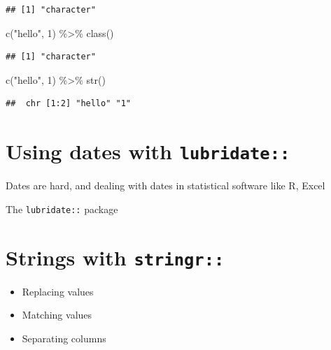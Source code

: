\documentclass[
]{book}
\newenvironment{Shaded}{\begin{snugshade}}{\end{snugshade}}
\newcommand{\DecValTok}[1]{\textcolor[rgb]{0.00,0.00,0.81}{#1}}
\newcommand{\FunctionTok}[1]{\textcolor[rgb]{0.00,0.00,0.00}{#1}}
\newcommand{\NormalTok}[1]{#1}
\newcommand{\SpecialCharTok}[1]{\textcolor[rgb]{0.00,0.00,0.00}{#1}}
\newcommand{\StringTok}[1]{\textcolor[rgb]{0.31,0.60,0.02}{#1}}
\providecommand{\tightlist}{%
  \setlength{\itemsep}{0pt}\setlength{\parskip}{0pt}}
\begin{document}
\begin{verbatim}
## [1] "character"
\end{verbatim}

\begin{Shaded}
\begin{Highlighting}[]
\FunctionTok{c}\NormalTok{(}\StringTok{"hello"}\NormalTok{, }\DecValTok{1}\NormalTok{) }\SpecialCharTok{\%\textgreater{}\%} \FunctionTok{class}\NormalTok{()}
\end{Highlighting}
\end{Shaded}

\begin{verbatim}
## [1] "character"
\end{verbatim}

\begin{Shaded}
\begin{Highlighting}[]
\FunctionTok{c}\NormalTok{(}\StringTok{"hello"}\NormalTok{, }\DecValTok{1}\NormalTok{) }\SpecialCharTok{\%\textgreater{}\%} \FunctionTok{str}\NormalTok{()}
\end{Highlighting}
\end{Shaded}

\begin{verbatim}
##  chr [1:2] "hello" "1"
\end{verbatim}

\hypertarget{using-dates-with-lubridate}{%
\section{\texorpdfstring{Using dates with \texttt{lubridate::}}{Using dates with lubridate::}}\label{using-dates-with-lubridate}}

Dates are hard, and dealing with dates in statistical software like R, Excel

The \texttt{lubridate::} package

\hypertarget{strings-with-stringr}{%
\section{\texorpdfstring{Strings with \texttt{stringr::}}{Strings with stringr::}}\label{strings-with-stringr}}

\begin{itemize}
\tightlist
\item
  Replacing values
\item
  Matching values
\item
  Separating columns
\end{itemize}
\end{document}
